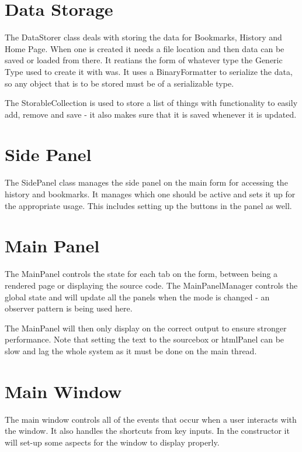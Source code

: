 \documentclass[11pt]{report}
\begin{document}
\section{Data Storage}

The DataStorer class deals with storing the data for Bookmarks, History and Home Page.  When one is created it needs a file location and then data can be saved or loaded from there.  It reatians the form of whatever type the Generic Type used to create it with was.  It uses a BinaryFormatter to serialize the data, so any object that is to be stored must be of a serializable type.

The StorableCollection is used to store a list of things with functionality to easily add, remove and save - it also makes sure that it is saved whenever it is updated.

\section{Side Panel}

The SidePanel class manages the side panel on the main form for accessing the history and bookmarks.  It manages which one should be active and sets it up for the appropriate usage.  This includes setting up the buttons in the panel as well.

\section{Main Panel}

The MainPanel controls the state for each tab on the form, between being a rendered page or displaying the source code.  The MainPanelManager controls the global state and will update all the panels when the mode is changed - an observer pattern is being used here.

The MainPanel will then only display on the correct output to ensure stronger performance.  Note that setting the text to the sourcebox or htmlPanel can be slow and lag the whole system as it must be done on the main thread.

\section{Main Window}

The main window controls all of the events that occur when a user interacts with the window.  It also handles the shortcuts from key inputs.  In the constructor it will set-up some aspects for the window to display properly.
\end{document}
